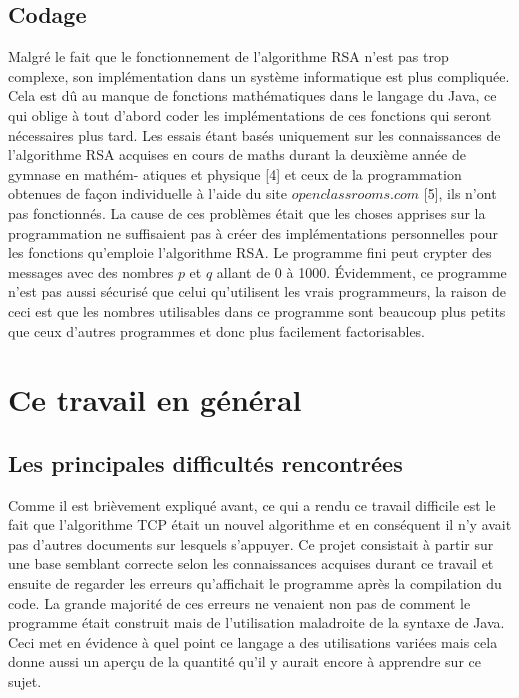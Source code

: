 \documentclass[a4paper,12pt]{report}
\begin{document}
 \subsection{Codage}
 Malgré le fait que le fonctionnement de l'algorithme RSA n'est pas trop complexe, son implémentation dans un système informatique est plus compliquée. Cela est dû au manque de fonctions mathématiques dans le langage du Java, ce qui oblige à tout d'abord coder les implémentations de ces fonctions qui seront nécessaires plus tard. \newline
 Les essais étant basés uniquement sur les connaissances de l'algorithme RSA acquises en cours de maths durant la deuxième année de gymnase en mathém- \newline
 atiques et physique [4] et ceux de la programmation obtenues de façon individuelle à l'aide du site $openclassrooms.com$ [5], ils n'ont pas fonctionnés. La cause de ces problèmes était que les choses apprises sur la programmation ne suffisaient pas à créer des implémentations personnelles pour les fonctions qu'emploie l'algorithme RSA. Le programme fini peut crypter des messages avec des nombres $p$ et $q$ allant de 0 à 1000.\newline
Évidemment, ce programme n'est pas aussi sécurisé que celui qu'utilisent les vrais programmeurs, la raison de ceci est que les nombres utilisables dans ce programme sont beaucoup plus petits que ceux d'autres programmes et donc plus facilement factorisables.

\pagebreak

     \section{Ce travail en général}
     
     \subsection{Les principales difficultés rencontrées}
     Comme il est brièvement expliqué avant, ce qui a rendu ce travail difficile est le fait que l'algorithme TCP était un nouvel algorithme et en conséquent il n'y avait pas d'autres documents sur lesquels s'appuyer. \newline
     Ce projet consistait à partir sur une base semblant correcte selon les connaissances acquises durant ce travail et ensuite de regarder les erreurs qu'affichait le programme après la compilation du code. La grande majorité de ces erreurs ne venaient non pas de comment le programme était construit mais de l'utilisation maladroite de la syntaxe de Java. Ceci met en évidence à quel point ce langage a des utilisations variées mais cela donne aussi un aperçu de la quantité qu'il y aurait encore à apprendre sur ce sujet.      
          
\end{document}
